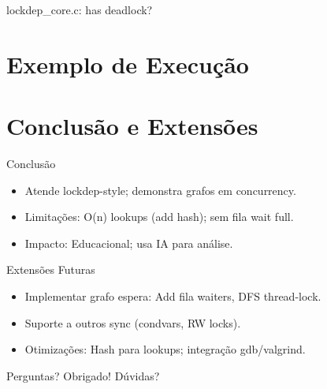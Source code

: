 \documentclass{beamer}
\newcommand{\cCore}{../../src/lockdep/lockdep_core.c}
\begin{document}
\begin{frame}{lockdep_core.c: has deadlock?}
  
\end{frame}

\section{Exemplo de Execução}


\section{Conclusão e Extensões}
\begin{frame}{Conclusão}
  \begin{itemize}
    \item Atende lockdep-style; demonstra grafos em concurrency.
    \item Limitações: O(n) lookups (add hash); sem fila wait full.
    \item Impacto: Educacional; usa IA para análise.
  \end{itemize}
\end{frame}

\begin{frame}{Extensões Futuras}
  \begin{itemize}
    \item Implementar grafo espera: Add fila waiters, DFS thread-lock.
    \item Suporte a outros sync (condvars, RW locks).
    \item Otimizações: Hash para lookups; integração gdb/valgrind.
  \end{itemize}
\end{frame}

\begin{frame}{Perguntas?}
  \centering
  \Huge Obrigado! Dúvidas?
\end{frame}
\end{document}
